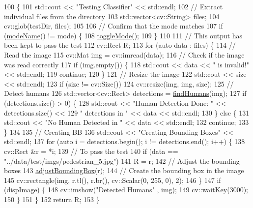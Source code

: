 \begin{DoxyCode}
100                                                                             \{
101     std::cout << \textcolor{stringliteral}{"Testing Classifier"} << std::endl;
102     \textcolor{comment}{// Extract individual files from the directory}
103     std::vector<cv::String> files;
104     cv::glob(testDir, files);
105 
106     \textcolor{comment}{// Confirm that the mode matches}
107     \textcolor{keywordflow}{if} (\hyperlink{classDetect_a0742e945747fa012fb22d957a459978c}{modeName}() != mode) \{
108         \hyperlink{classDetect_a75d4c27eb616460a8ba5a387620626e6}{toggleMode}();
109     \}
110 
111     \textcolor{comment}{// This output has been kept to pass the test}
112     cv::Rect R;
113     \textcolor{keywordflow}{for} (\textcolor{keyword}{auto} data : files) \{
114         \textcolor{comment}{// Read the image}
115         cv::Mat img = cv::imread(data);
116         \textcolor{comment}{// Check if the image was read correctly}
117         \textcolor{keywordflow}{if} (img.empty()) \{
118             std::cout << data << \textcolor{stringliteral}{" is invalid!"} << std::endl;
119             \textcolor{keywordflow}{continue};
120         \}
121         \textcolor{comment}{// Resize the image}
122         std::cout << size << std::endl;
123         \textcolor{keywordflow}{if} (size != cv::Size())
124             cv::resize(img, img, size);
125         \textcolor{comment}{// Detect humans}
126         std::vector<cv::Rect> detections = \hyperlink{classDetect_a1d25bc00785e30f42c1f6211d11786d0}{findHumans}(img);
127         \textcolor{keywordflow}{if} (detections.size() > 0) \{
128             std::cout << \textcolor{stringliteral}{"Human Detection Done: "} << detections.size() <<
129                          \textcolor{stringliteral}{" detections in "} << data << std::endl;
130         \} \textcolor{keywordflow}{else} \{
131             std::cout << \textcolor{stringliteral}{"No Human Detected in "} << data << std::endl;
132             \textcolor{keywordflow}{continue};
133         \}
134 
135         \textcolor{comment}{// Creating BB}
136         std::cout << \textcolor{stringliteral}{"Creating Bounding Boxes"} << std::endl;
137         \textcolor{keywordflow}{for} (\textcolor{keyword}{auto} i = detections.begin(); i != detections.end(); i++) \{
138             cv::Rect &r = *i;
139             \textcolor{comment}{// To pass the test}
140             \textcolor{keywordflow}{if} (data == \textcolor{stringliteral}{"../data/test/imgs/pedestrian\_5.jpg"})
141                 R = r;
142             \textcolor{comment}{// Adjust the bounding boxes}
143             \hyperlink{classDetect_a9b8ebb6ab8c9a07febbba30c03f55fce}{adjustBoundingBox}(r);
144             \textcolor{comment}{// Create the bounding box in the image}
145             cv::rectangle(img, r.tl(), r.br(), cv::Scalar(0, 255, 0), 2);
146         \}
147         \textcolor{keywordflow}{if} (dispImage) \{
148             cv::imshow(\textcolor{stringliteral}{"Detected Humans"} , img);
149             cv::waitKey(3000);
150         \}
151     \}
152     \textcolor{keywordflow}{return} R;
153 \}
\end{DoxyCode}
